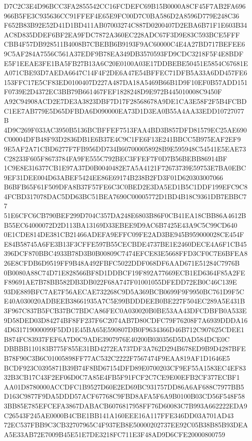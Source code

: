 \documentclass[UTF8,fontset=fandol,zihao=-4,a4paper]{ctexart}
\begin{document}
{{D7C2C3E4D96BCC3FA2855542CC16FCDEFC69B15B0000A8CF45F7AB2FA696966B5FE3C935636CC91FFEF4E65E9FC00D7C0BA586D2A8596D779E248C36
F652B83B92E52D41D1BD411AB07003274C887D0200407D2EBA6B71F1E603B34AC8D835DDEF6BF2EA9FDC7872A360EC228ADC67F3D9E83C593BCE5FFF
CBB4F57DB928511B4008B7CBEBB6B9193F9AC60000C4E4A27BD717BEFEE69C5AF284A7556C561A37EDF9B78EA349DB3570593FD9CDC3218F5F4E8BDF
E5F1EEAE3FE1BA5FB27B13A6C20E0100A03E17DDBEBE50451E5854C67681EA071CBE93D7AEDA6647C14F4F2DE6A47E54BFFEC71DFB5A33A6DD457FE6
153FFC17E5CF83ED0100407D227A487DA18A5469B66B1D9F10EF0B57ADD151F0739E2D4372EC3BB79B661467FEF1828248D9E972B445010008C9450F
A92C94908ACD2E7DE3A3823DBF7D17F28568678A9DE1CA3E58F2F5B4FCBDC1EE7AB779E5D65DFBDA6D090000EA73D1D3EA0B55A4AA33EDD10727077B
4D9C269F033AC3950B5136BCBFFEF7513FAA4BD3B857DFD81579EC25AE690C00004DFB48F93D2836DB1E6B37E4C9C1FE6F13E241BBCC5B975EAF2EF9
9E5AF2A71CBD6277F7FB956DD734B607000058928B9E595948C54541E5EAE73C28233F605F8673784FA9FE555C792BEC3FFEF7F0D7B56BEBB86914BF
1C9E8E316377CB1E97A37D0B0040482E7A5A4121F72673739E59753E7BA0EBC9EF31DEE004D63ABEF5424EE86E69174B238B2FD3F01D620303007066
B6BFB65F61F509DFA8B37F57FE6C3C0BED2E3DA5ED1B5C1DDF199EFC9C84FCBD317078DAC5DD63BC51BEA7690C00005772D1BD4B18C9361DB7EBBC77
51E6CFC6CB790BEF299D704C357DA248E6803B86F0CB41EA18CBB86A4612BB55EC64000072D2D113BA13169D33EBEE9D9AC6B7425E43A9C5C99CD640
0E1CDE814DE381CB21466ADEFA9EFFC09FE2AD3BE945B959000028CE454FE84B58745A6FE3B13F3CFFE597B55CECBDE4737BE1E2460DECE4A6F1CB45
396DCF870BBC4933B78D3B0B00809C7474EFCE83E5668FFD3CF0C7E6BFEA826E8CFDB6D9519FF9B48A492FBFC5022DDF068DF6AAD671E51284C7976B
0B0080A88C74D71E828566BF8D1DDBCF19F892A77669ECB1ED6364F85A2FEF89691AE7B78BB582DB3DB022F68A747F01001055DFEDD72EB0C46C139E
93DE889BFC7AE7F56AECAE732268C9D5A369BCB0699F9F9950BC761D9F5CE40A030020ADBEEB38661935A7C5E99BDDDEEB0BE227F504EC289A5E431B
3F967C837B5FCB37BC7BDCA86FEC0A030020B0BE53AA43DFCDBFB0A533E9D58DED03D84274BF8FF237F6C2074AB7D80CDFC79F76208F7A6939DDDA16
4D631719000099F5DD1E45BA65E590807DB0F9634366D46B712C907625CDEE1B874FC83937FEF6A7D0C9ADE3907976E40200B030356D5DAD584DCE0C
DBBBB110183B775F855E31BD4272EA737DF3A762D294B678ED9B9D4287BFEB78F90C3B6C01005898FF77AC532C2222F7567474F9EAA819AF1D1646E5
BCDF923C0395871B39B74F8BD67154DFD89E0700203CF9EF55A1583EC4EF8332B3CB17C43F2EF06D0C7A85E4FB5F91FCF2C7CE9E00EFB2CF377ECBF1
AA01D8780000ACCDFC1B9527D60E2ED69BC931757DD86A6AF688C7977BB5D163C9877F9DA5DDD57ACF67768C9FBD8AFA5F6A9B0100B03CD56F548F58
3BB85E785EFCEFA3867DABACB6076817958FF76D60083C7B993A662222EDA9C26543F245AE0000B4CBE1BB141A160EEE16A117FFE346DD03A701AD43
72EC537FBB9C3CB32707965C4F937EB8E50000202737EE92C05B38B85B93DEAA5E33AB72E7009B45E51E7DE3218FC711E3F48AD9D6CFE20000800759
}}
\end{document}
